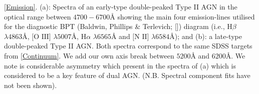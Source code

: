 \label{Emission} \ref{Emission}. (a): Spectra of an early-type double-peaked Type II AGN in the optical range between $4700-6700Å$ showing the main four emission-lines utilised for the diagnostic BPT (Baldwin, Phillips \& Terlevich; [\cite{Baldwin_1981}]) diagram (i.e., $\text{H}\beta$ $\lambda4863Å$, $\text{[O III]}$ $\lambda5007Å$, $\text{H}\alpha$ $\lambda6565Å$ and $\text{[N II]}$ $\lambda6584Å$); and (b): a late-type double-peaked Type II AGN. Both spectra correspond to the same SDSS targets from \ref{Continuum}. We add our own axis break between $5200Å$ and $6200Å$. We note is considerable asymmetry which present in the spectra of (a) which is considered to be a key feature of dual AGN. (N.B. Spectral component fits have not been shown).